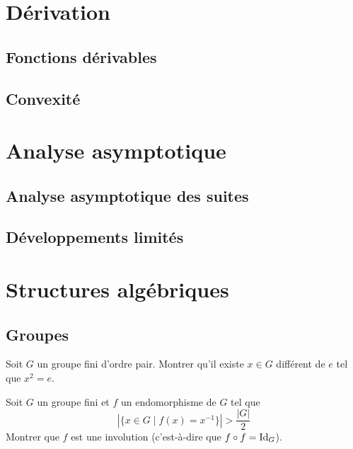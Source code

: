 \documentclass[12pt,a4paper]{exo_book}
\begin{document}

\chapter{Dérivation}

\section{Fonctions dérivables}

\section{Convexité}

\chapter{Analyse asymptotique}

\section{Analyse asymptotique des suites}

\section{Développements limités}

\chapter{Structures algébriques}

\section{Groupes}


\begin{exo}
    
\end{exo}

\begin{exo}
    Soit $G$ un groupe fini d'ordre pair. Montrer qu'il existe $x\in G$ différent de $e$ tel que $x^2 = e$.
\end{exo}

\begin{exo}
    Soit $G$ un groupe fini et $f$ un endomorphisme de $G$ tel que
    \[|\{x \in G \mid f(x) = x^{-1}\}| > \frac{|G|}{2}\]
    Montrer que $f$ est une involution (c'est-à-dire que $f \circ f = \mathrm{Id}_G$).
\end{exo}
\end{document}
